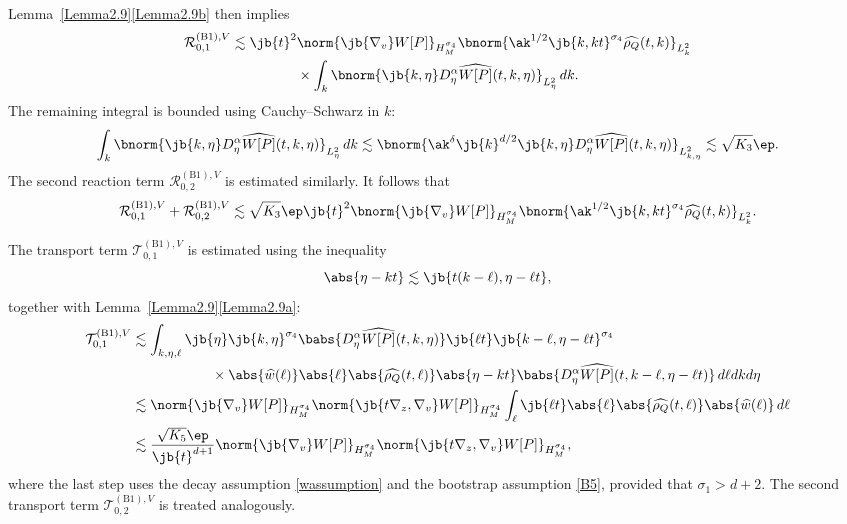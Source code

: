 \pagebreak[2]\noindent
Lemma~\ref{Lemma2.9}\eqref{Lemma2.9b} then implies
\begin{multline*}
\mathcal{R}_{0,1}^{\mathrm{(B1)},V}\lesssim\jb{t}^2\norm{\jb{\nabla_v}W[P]}_{H^{\sigma_4}_M}\bnorm{\ak^{1/2}\jb{k,kt}^{\sigma_4}\widehat{\rho_Q}(t,k)}_{L^2_k}\\
{}\times\int_k\bnorm{\jb{k,\eta}D^\alpha_\eta\widehat{W[P]}(t,k,\eta)}_{L^2_\eta}\,dk.
\end{multline*}
The remaining integral is bounded using Cauchy--Schwarz in $k$:
\begin{align*}
\int_k\bnorm{\jb{k,\eta}D^\alpha_\eta\widehat{W[P]}(t,k,\eta)}_{L^2_\eta}\,dk\lesssim\bnorm{\ak^\delta\jb{k}^{d/2}\jb{k,\eta}D^\alpha_\eta\widehat{W[P]}(t,k,\eta)}_{L^2_{k,\eta}}\lesssim \sqrt{K_3}\ep.
\end{align*}
The second reaction term \(\mathcal{R}_{0,2}^{\mathrm{(B1)},V}\) is estimated similarly. It follows that
\begin{align*}
\mathcal{R}_{0,1}^{\mathrm{(B1)},V}+\mathcal{R}_{0,2}^{\mathrm{(B1)},V}\lesssim\sqrt{K_3}\ep\jb{t}^2\bnorm{\jb{\nabla_v}W[P]}_{H^{\sigma_4}_M}\bnorm{\ak^{1/2}\jb{k,kt}^{\sigma_4}\widehat{\rho_Q}(t,k)}_{L^2_k}.
\end{align*}

The transport term $\mathcal{T}_{0,1}^{\mathrm{(B1)},V}$ is estimated using the inequality
\[
\abs{\eta - kt} \lesssim \jb{t(k - \ell), \eta - \ell t},
\]
together with Lemma~\ref{Lemma2.9}\eqref{Lemma2.9a}:
\begin{align*}
\mathcal{T}_{0,1}^{\mathrm{(B1)},V}&\lesssim\int_{k,\eta,\ell }\jb{\eta}\jb{k,\eta}^{\sigma_4}\babs{D_\eta^\alpha \widehat{W[P]}(t,k,\eta)}\jb{\ell t}\jb{k-\ell ,\eta-\ell t}^{\sigma_4}\\
&\hspace{2cm}\times\abs{\widehat{w}(\ell )}\abs{\ell }\abs{\widehat{\rho_Q}(t,\ell )}\abs{\eta-kt}\babs{D_\eta^\alpha\widehat{W[P]}(t,k-\ell ,\eta-\ell t)}\,d\ell dkd\eta\\
&\lesssim\norm{\jb{\nabla_v}W[P]}_{H^{\sigma_4}_M}\norm{\jb{t\nabla_z,\nabla_v}W[P]}_{H^{\sigma_4}_M}\int_\ell\jb{\ell t}\abs{\ell }\abs{\widehat{\rho_Q}(t,\ell )}\abs{\widehat w(\ell )}\,d\ell \\
&\lesssim \frac{\sqrt{K_5}\ep}{\jb{t}^{d+1}}\norm{\jb{\nabla_v}W[P]}_{H^{\sigma_4}_M}\norm{\jb{t\nabla_z,\nabla_v}W[P]}_{H^{\sigma_4}_M},
\end{align*}
where the last step uses the decay assumption \eqref{wassumption} and the bootstrap assumption \eqref{B5}, provided that $\sigma_1 > d + 2$. The second transport term $\mathcal{T}_{0,2}^{\mathrm{(B1)},V}$ is treated analogously.

